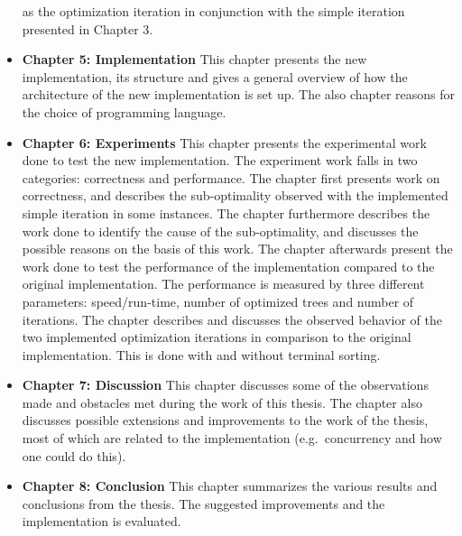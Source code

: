 \begin{itemize}
  as the optimization iteration in conjunction with the simple iteration
  presented in Chapter 3.
\item \textbf{Chapter 5: Implementation} \quad This chapter presents the new
  implementation, its structure and gives a general overview of how the
  architecture of the new implementation is set up. The also chapter reasons for
  the choice of programming language.
\item \textbf{Chapter 6: Experiments} \quad This chapter presents the
  experimental work done to test the new implementation. The experiment work
  falls in two categories: correctness and performance. The chapter first
  presents work on correctness, and describes the sub-optimality observed with
  the implemented simple iteration in some instances. The chapter furthermore
  describes the work done to identify the cause of the sub-optimality, and
  discusses the possible reasons on the basis of this work. The chapter
  afterwards present the work done to test the performance of the implementation
  compared to the original implementation. The performance is measured by three
  different parameters: speed/run-time, number of optimized trees and number of
  iterations. The chapter describes and discusses the observed behavior of the
  two implemented optimization iterations in comparison to the original
  implementation. This is done with and without terminal sorting. 
\item \textbf{Chapter 7: Discussion} \quad This chapter discusses some of the
  observations made and obstacles met during the work of this thesis. The
  chapter also discusses possible extensions and improvements to the work of the
  thesis, most of which are related to the implementation (e.g.\ concurrency and
  how one could do this).
\item \textbf{Chapter 8: Conclusion} \quad This chapter summarizes the various
  results and conclusions from the thesis. The suggested improvements and the
  implementation is evaluated.
\end{itemize}

